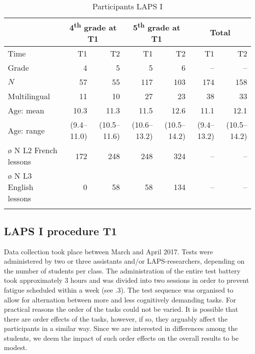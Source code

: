 \documentclass[output=paper]{langsci/langscibook}
\begin{document}
\begin{table}
\begin{tabularx}{\textwidth}{lrrrrrr} 
\lsptoprule
& \multicolumn{2}{c}{4\textsuperscript{th} grade at T1} & \multicolumn{2}{c}{5\textsuperscript{th} grade at T1} & \multicolumn{2}{c}{Total}\\\midrule
Time & T1 & T2                          & T1 & T2                     & T1 & T2\\
Grade & 4 & 5                           & 5 & 6                       & -- & --\\
$N$ & 57 & 55                           & 117 & 103                   & 174 & 158\\
Multilingual & 11 & 10                  & 27 & 23                     & 38 & 33\\
Age: mean & 10.3  & 11.3                & 11.5  & 12.6                & 11.1  & 12.1\\
Age: range& (9.4--11.0)  & (10.5--11.6) & (10.6--13.2) & (10.5--14.2) & (9.4--13.2) & (10.5--14.2)\\
ø N L2 French lessons & 172 & 248       & 248 & 324                   & -- & --\\
ø N L3 English lessons & 0 & 58         & 58 & 134                    & -- & --\\
\lspbottomrule
\end{tabularx}
\caption{Participants LAPS I\label{tab:02:2}}
\end{table}

  \subsection{LAPS I procedure T1}


Data collection took place between March and April 2017. Tests were administered by two or three assistants and/or LAPS-researchers, depending on the number of students per class. The administration of the entire test battery took approximately 3 hours and was divided into two sessions in order to prevent fatigue scheduled within a week (see .3). The test sequence was organised to allow for alternation between more and less cognitively demanding tasks. For practical reasons the order of the tasks could not be varied. It is possible that there are order effects of the tasks, however, if so, they arguably affect the participants in a similar way. Since we are interested in differences among the students, we deem the impact of such order effects on the overall results to be modest.
\end{document}
